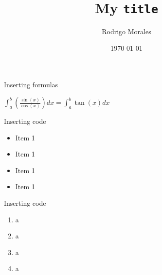 \documentclass{beamer}
\title{My \texttt{title}}
\author{Rodrigo Morales}
\institute{UTEC}
\date{\today}
\begin{document}
	\begin{frame}
		\titlepage 
	\end{frame}

	\begin{frame}{Inserting formulas}
		\begin{center}
			$\int_{a}^{b} \left(\frac{\sin \left( x \right)}{\cos \left( x \right)}\right) dx= \int_{a}^{b} \tan \left( x \right) dx$
		\end{center}
	\end{frame}

	\begin{frame}[fragile]{Inserting code}
		\begin{itemize}
			\item Item 1
			\item Item 1
			\item Item 1
			\item Item 1
		\end{itemize}
	\end{frame}
	
	\begin{frame}[fragile]{Inserting code}
		\begin{enumerate}
			\item a
			\item a
			\item a
			\item a
		\end{enumerate}
	\end{frame}
\end{document}
